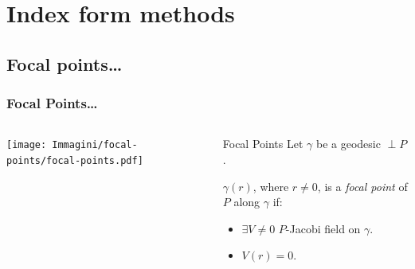 \documentclass[]{beamer}
\begin{document}
	\section{Index form methods}
	\subsection{Focal points\ldots}
	\begin{frame}
		\frametitle{Focal Points\ldots}
		\begin{columns}
			\centering
			\texttt{[image: Immagini/focal-points/focal-points.pdf]}
			\begin{defblock}{Focal Points}
				Let \(\gamma\) be a geodesic \(\perp P\).
				
				\(\gamma(r)\), where \(r \neq 0\), is a \emph{focal point} of \(P\) along \(\gamma\) if:
				\begin{itemize}
					\item \(\exists V\neq 0\) \(P\)-Jacobi field on \(\gamma\).
					\item \(V(r) = 0\).
				\end{itemize}
			\end{defblock}
		\end{columns}
	\end{frame}
\end{document}
